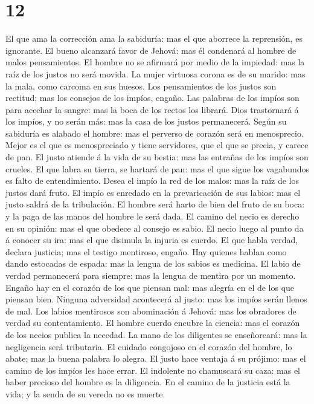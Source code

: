 \hypertarget{section-11}{%
\section{12}\label{section-11}}

 El que ama la corrección ama la sabiduría: mas el que
aborrece la reprensión, es ignorante.  El bueno alcanzará
favor de Jehová: mas él condenará al hombre de malos pensamientos.
 El hombre no se afirmará por medio de la impiedad: mas la
raíz de los justos no será movida.  La mujer virtuosa
corona es de su marido: mas la mala, como carcoma en sus huesos.
 Los pensamientos de los justos son rectitud; mas los
consejos de los impíos, engaño.  Las palabras de los
impíos son para acechar la sangre: mas la boca de los rectos los
librará.  Dios trastornará á los impíos, y no serán más:
mas la casa de los justos permanecerá.  Según su sabiduría
es alabado el hombre: mas el perverso de corazón será en menosprecio.
 Mejor es el que es menospreciado y tiene servidores, que
el que se precia, y carece de pan.  El justo atiende á la
vida de su bestia: mas las entrañas de los impíos son crueles.
 El que labra su tierra, se hartará de pan: mas el que
sigue los vagabundos es falto de entendimiento.  Desea el
impío la red de los malos: mas la raíz de los justos dará fruto.
 El impío es enredado en la prevaricación de sus labios:
mas el justo saldrá de la tribulación.  El hombre será
harto de bien del fruto de su boca: y la paga de las manos del hombre le
será dada.  El camino del necio es derecho en su opinión:
mas el que obedece al consejo es sabio.  El necio luego
al punto da á conocer su ira: mas el que disimula la injuria es cuerdo.
 El que habla verdad, declara justicia; mas el testigo
mentiroso, engaño.  Hay quienes hablan como dando
estocadas de espada: mas la lengua de los sabios es medicina.
 El labio de verdad permanecerá para siempre: mas la
lengua de mentira por un momento.  Engaño hay en el
corazón de los que piensan mal: mas alegría en el de los que piensan
bien.  Ninguna adversidad acontecerá al justo: mas los
impíos serán llenos de mal.  Los labios mentirosos son
abominación á Jehová: mas los obradores de verdad su contentamiento.
 El hombre cuerdo encubre la ciencia: mas el corazón de
los necios publica la necedad.  La mano de los diligentes
se enseñoreará: mas la negligencia será tributaria.  El
cuidado congojoso en el corazón del hombre, lo abate; mas la buena
palabra lo alegra.  El justo hace ventaja á su prójimo:
mas el camino de los impíos les hace errar.  El indolente
no chamuscará su caza: mas el haber precioso del hombre es la
diligencia.  En el camino de la justicia está la vida; y
la senda de su vereda no es muerte.

